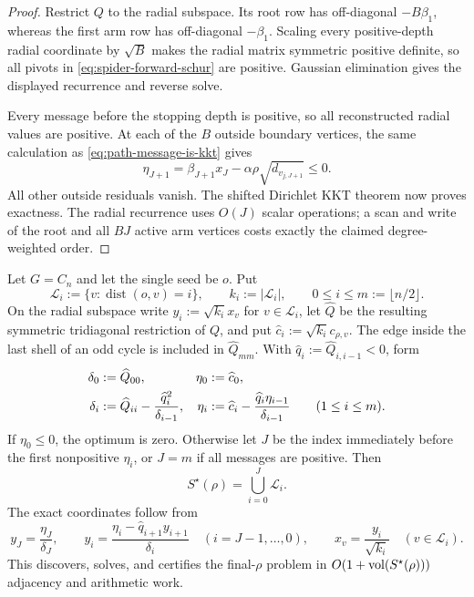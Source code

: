 \begin{proof}
Restrict $Q$ to the radial subspace.  Its root row has off-diagonal
$-B\beta_1$, whereas the first arm row has off-diagonal $-\beta_1$.
Scaling every positive-depth radial coordinate by $\sqrt B$ makes the radial
matrix symmetric positive definite, so all pivots in
\cref{eq:spider-forward-schur} are positive.  Gaussian elimination gives the
displayed recurrence and reverse solve.

Every message before the stopping depth is positive, so all reconstructed
radial values are positive.  At each of the $B$ outside boundary vertices,
the same calculation as \cref{eq:path-message-is-kkt} gives
\begin{equation}
 \eta_{J+1}
 =\beta_{J+1}x_J-\alpha\rho\sqrt{d_{v_{j,J+1}}}\leq0.
 \label{eq:spider-message-is-kkt}
\end{equation}
All other outside residuals vanish.  The shifted Dirichlet KKT theorem now
proves exactness.  The radial recurrence uses $O(J)$ scalar operations; a
scan and write of the root and all $BJ$ active arm vertices costs exactly the
claimed degree-weighted order.
\end{proof}

\begin{theorem}
\label{thm:cycle-one-pass}
Let $G=C_n$ and let the single seed be $o$.  Put
\begin{equation*}
 \mathcal L_i:=\{v:\operatorname{dist}(o,v)=i\},
 \qquad k_i:=|\mathcal L_i|,
 \qquad 0\leq i\leq m:=\lfloor n/2\rfloor.
\end{equation*}
On the radial subspace write $y_i:=\sqrt{k_i}x_v$ for
$v\in\mathcal L_i$, let $\widehat Q$ be the resulting symmetric
tridiagonal restriction of $Q$, and put
$\widehat c_i:=\sqrt{k_i}c_{\rho,v}$.  The edge inside the last shell of an
odd cycle is included in $\widehat Q_{mm}$.  With
$\widehat q_i:=\widehat Q_{i,i-1}<0$, form
\begin{align}
 \delta_0&:=\widehat Q_{00},
 &\eta_0&:=\widehat c_0,
 \notag\\
 \delta_i&:=\widehat Q_{ii}-\frac{\widehat q_i^2}{\delta_{i-1}},
 &\eta_i&:=\widehat c_i-
   \frac{\widehat q_i\eta_{i-1}}{\delta_{i-1}}
 \qquad(1\leq i\leq m).
 \label{eq:cycle-radial-schur}
\end{align}
If $\eta_0\leq0$, the optimum is zero.  Otherwise let $J$ be the index
immediately before the first nonpositive $\eta_i$, or $J=m$ if all messages
are positive.  Then
\begin{equation}
 S^\star(\rho)=\bigcup_{i=0}^J\mathcal L_i.
 \label{eq:cycle-radial-support}
\end{equation}
The exact coordinates follow from
\begin{equation}
 y_J=\frac{\eta_J}{\delta_J},
 \qquad
 y_i=\frac{\eta_i-\widehat q_{i+1}y_{i+1}}{\delta_i}
 \quad(i=J-1,\ldots,0),
 \qquad
 x_v=\frac{y_i}{\sqrt{k_i}}
 \quad(v\in\mathcal L_i).
 \label{eq:cycle-radial-backsolve}
\end{equation}
This discovers, solves, and certifies the final-$\rho$ problem in
$O(1+\operatorname{vol}(S^\star(\rho)))$ adjacency and arithmetic work.
\end{theorem}

